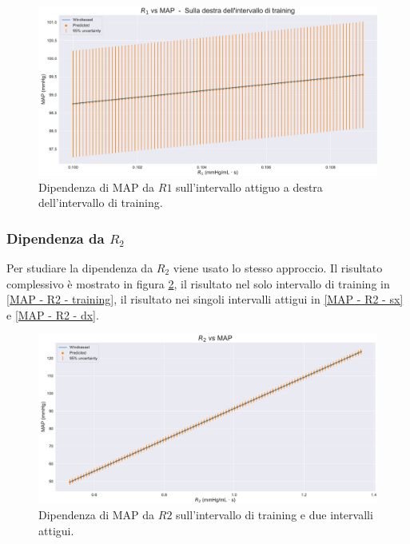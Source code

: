 \begin{figure}
    \centering
    \includegraphics[width=1\textwidth]{images/Training (risultati)/MAP/MAP - R1 - dx.pdf}
    \caption{Dipendenza di MAP da $R1$ sull'intervallo attiguo a destra dell'intervallo di training.}
    \label{MAP - R1 - dx}
\end{figure}




\newpage
\subsubsection{Dipendenza da $R_2$}
Per studiare la dipendenza da $R_2$ viene usato lo stesso approccio. Il risultato complessivo è mostrato in figura \ref{MAP - R2 - full}, il risultato nel solo intervallo di training in \ref{MAP - R2 - training}, il risultato nei singoli intervalli attigui in \ref{MAP - R2 - sx} e \ref{MAP - R2 - dx}.

\begin{figure}[!htb]
    \centering
    \includegraphics[width=1\textwidth]{images/Training (risultati)/MAP/MAP - R2 - full.pdf}
    \caption{Dipendenza di MAP da $R2$ sull'intervallo di training e due intervalli attigui.}
    \label{MAP - R2 - full}
\end{figure}

